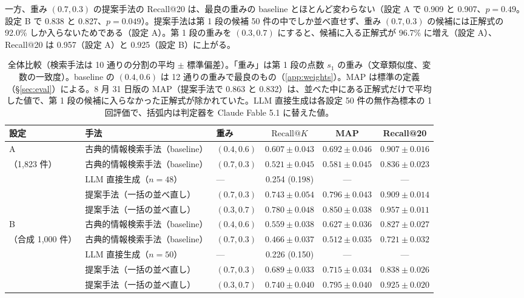 \documentclass[a4j,dvipdfmx,11pt]{jresume}
\makeatletter
\newcommand{\rk}{\textrm{Recall@}K}
\makeatother
\begin{document}
一方、重み $(0.7, 0.3)$ の提案手法の Recall@20 は、最良の重みの baseline とほとんど変わらない（設定 A で 0.909 と 0.907、$p = 0.49$。設定 B で 0.838 と 0.827、$p = 0.049$）。提案手法は第 1 段の候補 50 件の中でしか並べ直せず、重み $(0.7, 0.3)$ の候補には正解式の 92.0\% しか入らないためである（設定 A）。第 1 段の重みを $(0.3, 0.7)$ にすると、候補に入る正解式が 96.7\% に増え（設定 A）、Recall@20 は 0.957（設定 A）と 0.925（設定 B）に上がる。

\begin{table}[t]\centering
\caption{全体比較（検索手法は 10 通りの分割の平均 $\pm$ 標準偏差）。「重み」は第 1 段の点数 $s_1$ の重み（文章類似度、変数の一致度）。baseline の $(0.4, 0.6)$ は 12 通りの重みで最良のもの（\ref{app:weights}）。MAP は標準の定義（\S\ref{sec:eval}）による。8 月 31 日版の MAP（提案手法で 0.863 と 0.832）は、並べた中にある正解式だけで平均した値で、第 1 段の候補に入らなかった正解式が除かれていた。LLM 直接生成は各設定 50 件の無作為標本の 1 回評価で、括弧内は判定器を Claude Fable 5.1 に替えた値。}
\label{tab:overall}
\footnotesize
\setlength{\tabcolsep}{4pt}
\begin{tabular}{@{}lllccc@{}}
\toprule
設定 & 手法 & 重み & $\rk$ & MAP & Recall@20 \\
\midrule
A & 古典的情報検索手法（baseline） & $(0.4, 0.6)$ & $0.607 \pm 0.043$ & $0.692 \pm 0.046$ & $0.907 \pm 0.016$ \\
（1{,}823 件） & 古典的情報検索手法（baseline） & $(0.7, 0.3)$ & $0.521 \pm 0.045$ & $0.581 \pm 0.045$ & $0.836 \pm 0.023$ \\
 & LLM 直接生成（$n = 48$） & --- & 0.254 (0.198) & --- & --- \\
 & 提案手法（一括の並べ直し） & $(0.7, 0.3)$ & $0.743 \pm 0.054$ & $0.796 \pm 0.043$ & $0.909 \pm 0.014$ \\
 & 提案手法（一括の並べ直し） & $(0.3, 0.7)$ & $\mathbf{0.780 \pm 0.048}$ & $\mathbf{0.850 \pm 0.038}$ & $\mathbf{0.957 \pm 0.011}$ \\
\midrule
B & 古典的情報検索手法（baseline） & $(0.4, 0.6)$ & $0.559 \pm 0.038$ & $0.627 \pm 0.036$ & $0.827 \pm 0.027$ \\
（合成 1{,}000 件） & 古典的情報検索手法（baseline） & $(0.7, 0.3)$ & $0.466 \pm 0.037$ & $0.512 \pm 0.035$ & $0.721 \pm 0.032$ \\
 & LLM 直接生成（$n = 50$） & --- & 0.226 (0.150) & --- & --- \\
 & 提案手法（一括の並べ直し） & $(0.7, 0.3)$ & $0.689 \pm 0.033$ & $0.715 \pm 0.034$ & $0.838 \pm 0.026$ \\
 & 提案手法（一括の並べ直し） & $(0.3, 0.7)$ & $\mathbf{0.740 \pm 0.040}$ & $\mathbf{0.795 \pm 0.040}$ & $\mathbf{0.925 \pm 0.020}$ \\
\bottomrule
\end{tabular}
\end{table}
\end{document}
